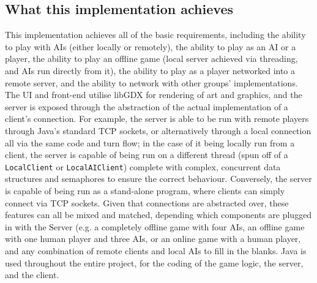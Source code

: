 \documentclass[a4paper,doc]{apa6}
\newcommand{\code}{\texttt}
\begin{document}
\subsection{What this implementation achieves}
This implementation achieves all of the basic requirements, including the ability to play with AIs (either locally or remotely), the ability to play as an AI or a player, the ability to play an offline game (local server achieved via threading, and AIs run directly from it), the ability to play as a player networked into a remote server, and the ability to network with other groups’ implementations. The UI and front-end utilise libGDX for rendering of art and graphics, and the server is exposed through the abstraction of the actual implementation of a client’s connection. For example, the server is able to be run with remote players through Java’s standard TCP sockets, or alternatively through a local connection all via the same code and turn flow; in the case of it being locally run from a client, the server is capable of being run on a different thread (spun off of a \code{LocalClient} or \code{LocalAIClient}) complete with complex, concurrent data structures and semaphores to ensure the correct behaviour. Conversely, the server is capable of being run as a stand-alone program, where clients can simply connect via TCP sockets. Given that connections are abstracted over, these features can all be mixed and matched, depending which components are plugged in with the Server (e.g. a completely offline game with four AIs, an offline game with one human player and three AIs, or an online game with a human player, and any combination of remote clients and local AIs to fill in the blanks. Java is used throughout the entire project, for the coding of the game logic, the server, and the client.
\end{document}

